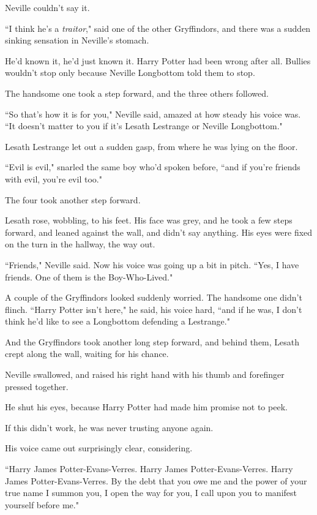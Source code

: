 Neville couldn't say it.

``I think he's a \emph{traitor}," said one of the other Gryffindors, and there was a sudden sinking sensation in Neville's stomach.

He'd known it, he'd just known it. Harry Potter had been wrong after all. Bullies wouldn't stop only because Neville Longbottom told them to stop.

The handsome one took a step forward, and the three others followed.

``So that's how it is for you," Neville said, amazed at how steady his voice was. ``It doesn't matter to you if it's Lesath Lestrange or Neville Longbottom."

Lesath Lestrange let out a sudden gasp, from where he was lying on the floor.

``Evil is evil," snarled the same boy who'd spoken before, ``and if you're friends with evil, you're evil too."

The four took another step forward.

Lesath rose, wobbling, to his feet. His face was grey, and he took a few steps forward, and leaned against the wall, and didn't say anything. His eyes were fixed on the turn in the hallway, the way out.

``Friends," Neville said. Now his voice was going up a bit in pitch. ``Yes, I have friends. One of them is the Boy-Who-Lived."

A couple of the Gryffindors looked suddenly worried. The handsome one didn't flinch. ``Harry Potter isn't here," he said, his voice hard, ``and if he was, I don't think he'd like to see a Longbottom defending a Lestrange."

And the Gryffindors took another long step forward, and behind them, Lesath crept along the wall, waiting for his chance.

Neville swallowed, and raised his right hand with his thumb and forefinger pressed together.

He shut his eyes, because Harry Potter had made him promise not to peek.

If this didn't work, he was never trusting anyone again.

His voice came out surprisingly clear, considering.

``Harry James Potter-Evans-Verres. Harry James Potter-Evans-Verres. Harry James Potter-Evans-Verres. By the debt that you owe me and the power of your true name I summon you, I open the way for you, I call upon you to manifest yourself before me."

